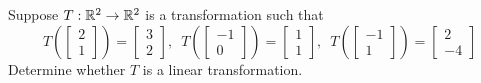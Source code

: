\documentclass{ximera}
\begin{document}
\begin{example}\label{ex:lineartrans1}
Suppose $T:\mathbb{R}^2\rightarrow\mathbb{R}^2$ is a transformation such that 
$$T\left(\begin{bmatrix}
2\\
1
\end{bmatrix}\right)=\begin{bmatrix}
3\\
2
\end{bmatrix},\,\,\,T\left(\begin{bmatrix}
-1\\
0
\end{bmatrix}\right)=\begin{bmatrix}
1\\
1
\end{bmatrix},\,\,\,T\left(\begin{bmatrix}
-1\\
1
\end{bmatrix}\right)=\begin{bmatrix}
2\\
-4
\end{bmatrix}$$
Determine whether $T$ is a linear transformation.



\end{example}
\end{document}
